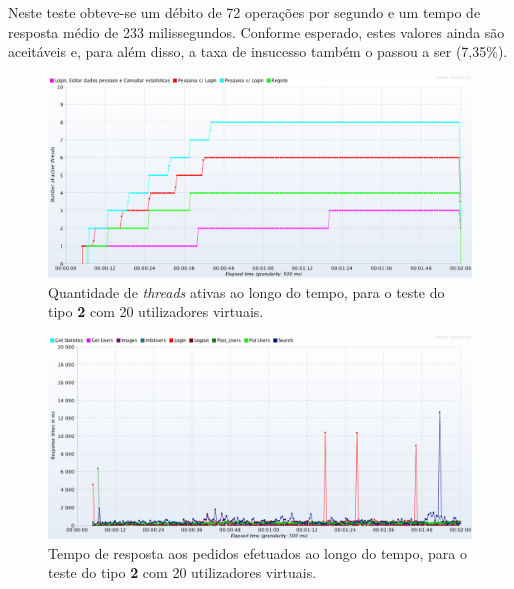 Neste teste obteve-se um débito de 72 operações por segundo e um tempo de resposta médio de 233 milissegundos. Conforme esperado, estes valores ainda são aceitáveis e, para além disso, a taxa de insucesso também o passou a ser (7,35\%). 


\begin{figure}[H]
    \centering
    \includegraphics[width=1\textwidth]{images/Testes/3PC_RU_20T.png}
    \caption{Quantidade de \textit{threads} ativas ao longo do tempo, para o teste do tipo \textbf{2} com 20 utilizadores virtuais.}
    \label{fig:3PC_RU_20_threads}
\end{figure}

\begin{figure}[H]
    \centering
    \includegraphics[width=1\textwidth]{images/Testes/3PC_RU_20R.png}
    \caption{Tempo de resposta aos pedidos efetuados ao longo do tempo, para o teste do tipo \textbf{2} com 20 utilizadores virtuais.}
    \label{fig:3PC_RU_20_response}
\end{figure}

